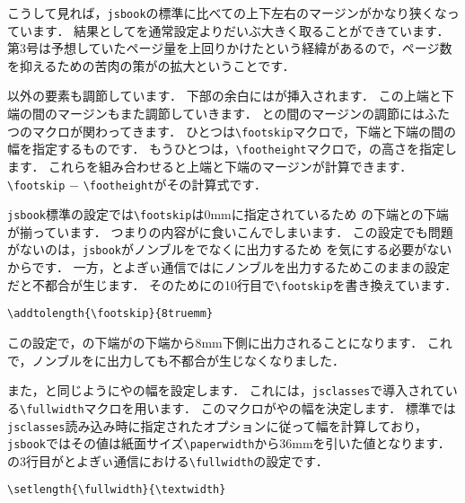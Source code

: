 こうして見れば，\verb|jsbook|の標準に比べての上下左右のマージンがかなり狭くなっています．
結果としてを通常設定よりだいぶ大きく取ることができています．
第3号は予想していたページ量を上回りかけたという経緯があるので，ページ数を抑えるための苦肉の策がの拡大ということです．

以外の要素も調節しています．
下部の余白にはが挿入されます．
この上端と下端の間のマージンもまた調節していきます．
との間のマージンの調節にはふたつのマクロが関わってきます．
ひとつは\verb|\footskip|マクロで，下端と下端の間の幅を指定するものです．
もうひとつは，\verb|\footheight|マクロで，の高さを指定します．
これらを組み合わせると上端と下端のマージンが計算できます．
\verb|\footskip| $-$ \verb|\footheight|がその計算式です．

\texttt{jsbook}標準の設定では\verb|\footskip|は0mmに指定されているため
の下端との下端が揃っています．
つまりの内容がに食いこんでしまいます．
この設定でも問題がないのは，\texttt{jsbook}がノンブルをでなくに出力するため
を気にする必要がないからです．
一方，とよぎぃ通信ではにノンブルを出力するためこのままの設定だと不都合が生じます．
そのためにの10行目で\verb|\footskip|を書き換えています．
\begin{verbatim}
\addtolength{\footskip}{8truemm}
\end{verbatim}

この設定で，の下端がの下端から8mm下側に出力されることになります．
これで，ノンブルをに出力しても不都合が生じなくなりました．

また，と同じようにやの幅を設定します．
これには，\texttt{jsclasses}で導入されている\verb|\fullwidth|マクロを用います．
このマクロがやの幅を決定します．
標準では\texttt{jsclasses}読み込み時に指定されたオプションに従って幅を計算しており，
\texttt{jsbook}ではその値は紙面サイズ\verb|\paperwidth|から36mmを引いた値となります．
の3行目がとよぎぃ通信における\verb|\fullwidth|の設定です．
\begin{verbatim}
\setlength{\fullwidth}{\textwidth}
\end{verbatim}

